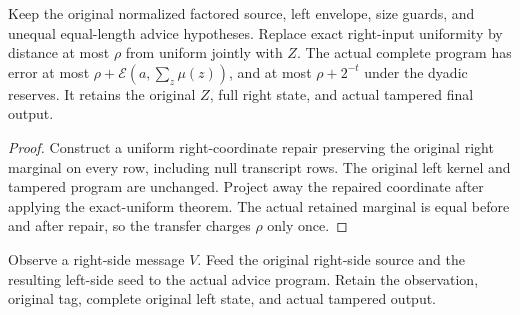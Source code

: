 \begin{theorem}
  \label{thm:lowerbounds-algebraic-advice-perturbed}
  \leanok
  Keep the original normalized factored source, left envelope, size
  guards, and unequal equal-length advice hypotheses. Replace exact
  right-input uniformity by distance at most $\rho$ from uniform
  jointly with $Z$. The actual complete program has error at most
  $\rho+\mathcal E(a,\sum_z\mu(z))$, and at most $\rho+2^{-t}$
  under the dyadic reserves. It retains the original $Z$, full right
  state, and actual tampered final output.
\end{theorem}
\begin{proof}
  \leanok
  Construct a uniform right-coordinate repair preserving the original
  right marginal on every row, including null transcript rows. The
  original left kernel and tampered program are unchanged. Project
  away the repaired coordinate after applying the exact-uniform
  theorem. The actual retained marginal is equal before and after
  repair, so the transfer charges $\rho$ only once.
\end{proof}

\begin{definition}
  \label{def:lowerbounds-algebraic-alternating-advice}
  \leanok
  Observe a right-side message $V$. Feed the original right-side
  source and the resulting left-side seed to the actual advice
  program. Retain the observation, original tag, complete original
  left state, and actual tampered output.
\end{definition}

